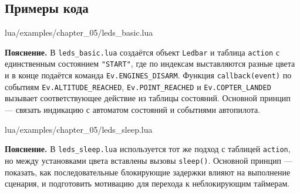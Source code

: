 \subsection{Примеры кода}
\begin{codefile}{lua/examples/chapter_05/leds_basic.lua}
\end{codefile}
\textbf{Пояснение.} В \verb|leds_basic.lua| создаётся объект \verb|Ledbar| и таблица \verb|action| с единственным состоянием \verb|"START"|, где по индексам выставляются разные цвета и в конце подаётся команда \verb|Ev.ENGINES_DISARM|. Функция \verb|callback(event)| по событиям \verb|Ev.ALTITUDE_REACHED|, \verb|Ev.POINT_REACHED| и \verb|Ev.COPTER_LANDED| вызывает соответствующее действие из таблицы состояний. Основной принцип — связать индикацию с автоматом состояний и событиями автопилота.

\begin{codefile}{lua/examples/chapter_05/leds_sleep.lua}
\end{codefile}
\textbf{Пояснение.} В \verb|leds_sleep.lua| используется тот же подход с таблицей \verb|action|, но между установками цвета вставлены вызовы \verb|sleep()|. Основной принцип — показать, как последовательные блокирующие задержки влияют на выполнение сценария, и подготовить мотивацию для перехода к неблокирующим таймерам.
